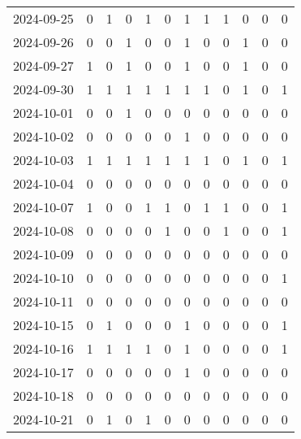 \documentclass[dvipdfmx,oneside]{article}
\begin{document}
\begin{tabular}{lccccccccccc}
        2024-09-25 &     0 &     1 &     0 &     1 &     0 &     1 &     1 &     1 &     0 &     0 &     0 \\
        2024-09-26 &     0 &     0 &     1 &     0 &     0 &     1 &     0 &     0 &     1 &     0 &     0 \\
        2024-09-27 &     1 &     0 &     1 &     0 &     0 &     1 &     0 &     0 &     1 &     0 &     0 \\
        2024-09-30 &     1 &     1 &     1 &     1 &     1 &     1 &     1 &     0 &     1 &     0 &     1 \\
        2024-10-01 &     0 &     0 &     1 &     0 &     0 &     0 &     0 &     0 &     0 &     0 &     0 \\
        2024-10-02 &     0 &     0 &     0 &     0 &     0 &     1 &     0 &     0 &     0 &     0 &     0 \\
        2024-10-03 &     1 &     1 &     1 &     1 &     1 &     1 &     1 &     0 &     1 &     0 &     1 \\
        2024-10-04 &     0 &     0 &     0 &     0 &     0 &     0 &     0 &     0 &     0 &     0 &     0 \\
        2024-10-07 &     1 &     0 &     0 &     1 &     1 &     0 &     1 &     1 &     0 &     0 &     1 \\
        2024-10-08 &     0 &     0 &     0 &     0 &     1 &     0 &     0 &     1 &     0 &     0 &     1 \\
        2024-10-09 &     0 &     0 &     0 &     0 &     0 &     0 &     0 &     0 &     0 &     0 &     0 \\
        2024-10-10 &     0 &     0 &     0 &     0 &     0 &     0 &     0 &     0 &     0 &     0 &     1 \\
        2024-10-11 &     0 &     0 &     0 &     0 &     0 &     0 &     0 &     0 &     0 &     0 &     0 \\
        2024-10-15 &     0 &     1 &     0 &     0 &     0 &     1 &     0 &     0 &     0 &     0 &     1 \\
        2024-10-16 &     1 &     1 &     1 &     1 &     0 &     1 &     0 &     0 &     0 &     0 &     1 \\
        2024-10-17 &     0 &     0 &     0 &     0 &     0 &     1 &     0 &     0 &     0 &     0 &     0 \\
        2024-10-18 &     0 &     0 &     0 &     0 &     0 &     0 &     0 &     0 &     0 &     0 &     0 \\
        2024-10-21 &     0 &     1 &     0 &     1 &     0 &     0 &     0 &     0 &     0 &     0 &     0 \\

\end{tabular}
\end{document}
